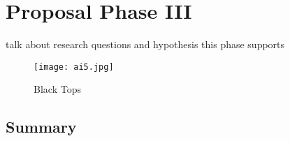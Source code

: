 \section{Proposal Phase III} \label{proposal:p3}
talk about research questions and hypothesis this phase supports

\begin{figure}
	\centering
	\caption{Black Tops}
	\centering	
	\texttt{[image: ai5.jpg]}
	\label{tab:ai5}
\end{figure}

\subsection{Summary}